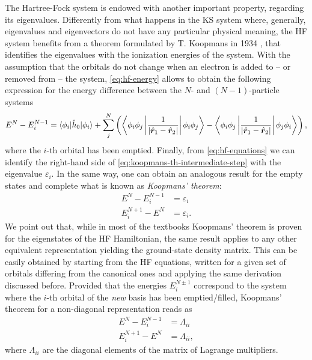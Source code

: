 The Hartree-Fock system is endowed with another important property, regarding its eigenvalues. Differently from what happens in the KS system where, generally, eigenvalues and eigenvectors do not have any particular physical meaning, the HF system benefits from a theorem formulated by T. Koopmans in 1934 \cite{koopmans_uber_1934}, that identifies the eigenvalues with the ionization energies of the system. With the assumption that the orbitals do not change when an electron is added to -- or removed from -- the system, \cref{eq:hf-energy} allows to obtain the following expression for the energy difference between the $N$- and $(N-1)$-particle systems
%
\begin{equation}
    E^N - E^{N-1}_i = \braket{\phi_i|\hat{h}_0|\phi_i} + \sum_j^N \left( 
    \left\langle \phi_i\phi_j \left| \frac{1}{|\hat{{\bm r}}_1-\hat{{\bm r}}_2|} \right| \phi_i\phi_j \right\rangle
    - \left\langle \phi_i\phi_j \left| \frac{1}{|\hat{{\bm r}}_1-\hat{{\bm r}}_2|} \right| \phi_j\phi_i \right\rangle
    \right) ,
    \label{eq:koopmans-th-intermediate-step}
\end{equation}
%
where the $i$-th orbital has been emptied. Finally, from \cref{eq:hf-equations} we can identify the right-hand side of \cref{eq:koopmans-th-intermediate-step} with the eigenvalue $\varepsilon_i$. In the same way, one can obtain an analogous result for the empty states and complete what is known as \emph{Koopmans' theorem}:
%
\begin{equation}
    \begin{split}
    E^N - E^{N-1}_i &= \varepsilon_i \\
    E^{N+1}_i - E^N &= \varepsilon_i .
    \end{split}
    \label{eq:koopmans-theorem}
\end{equation}
%
We point out that, while in most of the textbooks Koopmans' theorem is proven for the eigenstates of the HF Hamiltonian, the same result applies to any other equivalent representation yielding the ground-state density matrix. This can be easily obtained by starting from the HF equations, written for a given set of orbitals differing from the canonical ones and applying the same derivation discussed before. Provided that the energies $E^{N \pm 1}_i$ correspond to the system where the $i$-th orbital of the \emph{new} basis has been emptied/filled, Koopmans' theorem for a non-diagonal representation reads as
%
\begin{equation}
    \begin{split}
    E^N - E^{N-1}_i &= \Lambda_{ii} \\
    E^{N+1}_i - E^N &= \Lambda_{ii} ,
    \end{split}
    \label{eq:koopmans-theorem-noncanonical}
\end{equation}
%
where $\Lambda_{ii}$ are the diagonal elements of the matrix of Lagrange multipliers.


